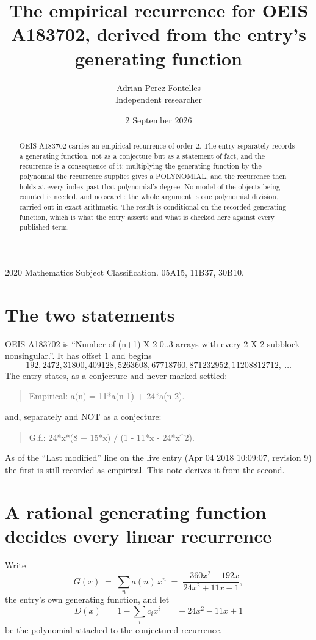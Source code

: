 \documentclass[11pt,a4paper]{article}
\title{The empirical recurrence for OEIS A183702, derived from the entry's generating function}
\author{Adrian Perez Fontelles\\ \small Independent researcher}
\date{2 September 2026}
\theoremstyle{plain}
\theoremstyle{definition}
\begin{document}
\maketitle

\begin{abstract}
OEIS A183702 carries an empirical recurrence of order $2$. The entry separately records a
generating function, not as a conjecture but as a statement of fact, and the recurrence is a
consequence of it: multiplying the generating function by the polynomial the recurrence
supplies gives a POLYNOMIAL, and the recurrence then holds at every index past that
polynomial's degree. No model of the objects being counted is needed, and no search: the
whole argument is one polynomial division, carried out in exact arithmetic. The result is
conditional on the recorded generating function, which is what the entry asserts and what is
checked here against every published term.
\end{abstract}

\noindent\small 2020 Mathematics Subject Classification. 05A15, 11B37, 30B10.\normalsize

\section{The two statements}

OEIS A183702 is ``Number of (n+1) X 2 0..3 arrays with every 2 X 2 subblock nonsingular.''. It has offset $1$ and begins
\[
192, 2472, 31800, 409128, 5263608, 67718760, 871232952, 11208812712,\ \dots
\]
The entry states, as a conjecture and never marked settled:
\begin{quote}
Empirical: a(n) = 11*a(n-1) + 24*a(n-2).
\end{quote}
and, separately and NOT as a conjecture:
\begin{quote}
G.f.: 24*x*(8 + 15*x) / (1 - 11*x - 24*x\^{}2).
\end{quote}
As of the ``Last modified'' line on the live entry (Apr 04 2018 10:09:07, revision 9) the first is still
recorded as empirical. This note derives it from the second.

\section{A rational generating function decides every linear recurrence}

Write
\[
G(x)\;=\;\sum_{n}a(n)\,x^{n}\;=\;\frac{- 360 x^{2} - 192 x}{24 x^{2} + 11 x - 1},
\]
the entry's own generating function, and let
\[
D(x)\;=\;1-\sum_i c_i x^{i}\;=\;- 24 x^{2} - 11 x + 1
\]
be the polynomial attached to the conjectured recurrence.
\end{document}
